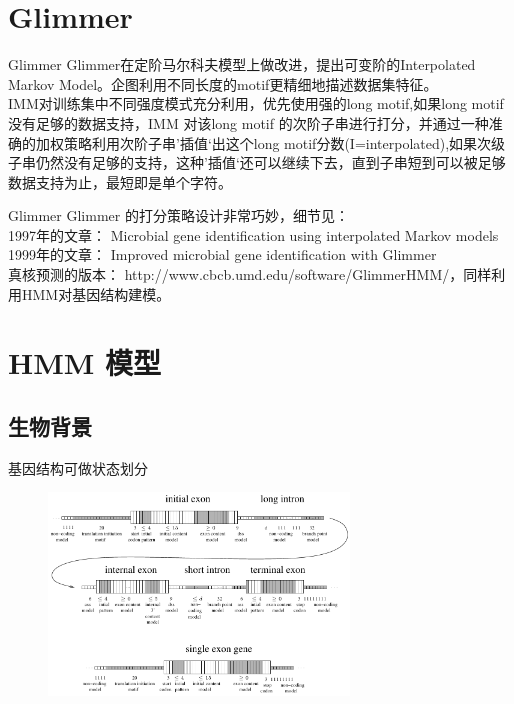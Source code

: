 \documentclass[handout]{beamer}
\begin{document}
\section{Glimmer}
\begin{frame}{Glimmer}
Glimmer在定阶马尔科夫模型上做改进，提出可变阶的Interpolated Markov Model。企图利用不同长度的motif更精细地描述数据集特征。\\                                                             
IMM对训练集中不同强度模式充分利用，优先使用强的long motif,如果long motif没有足够的数据支持，IMM 对该long motif 的次阶子串进行打分，并通过一种准确的加权策略利用次阶子串'插值‘出这个long motif分数\alert{(I=interpolated)},如果次级子串仍然没有足够的支持，这种’插值‘还可以继续下去，直到子串短到可以被足够数据支持为止，最短即是单个字符。\\
\end{frame}

\begin{frame}{Glimmer}
Glimmer 的打分策略设计非常巧妙，细节见：
\hyperlink{IMM frame}{}\\
1997年的文章：
\alert{Microbial gene identification using interpolated Markov models}\\
1999年的文章：
\alert{Improved microbial gene identification with Glimmer}\\
真核预测的版本：
\alert{http://www.cbcb.umd.edu/software/GlimmerHMM/}，同样利用HMM对基因结构建模。\\
\end{frame}
\section{HMM 模型}
\subsection{生物背景}
\begin{frame}{基因结构可做状态划分}
\begin{figure}
\centering
\includegraphics[width=8cm]{../pic/gene-structure.png}
\end{figure}
\end{frame}
\end{document}
